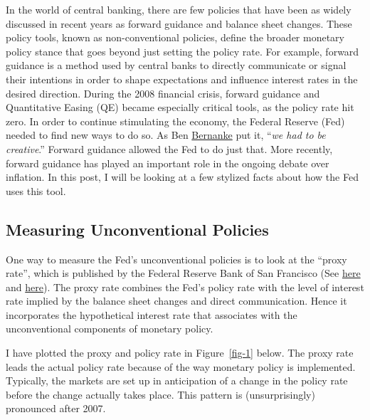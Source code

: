 \documentclass[
  letterpaper,
  DIV=11,
  numbers=noendperiod]{scrartcl}
\begin{document}
In the world of central banking, there are few policies that have been
as widely discussed in recent years as forward guidance and balance
sheet changes. These policy tools, known as non-conventional policies,
define the broader monetary policy stance that goes beyond just setting
the policy rate. For example, forward guidance is a method used by
central banks to directly communicate or signal their intentions in
order to shape expectations and influence interest rates in the desired
direction. During the 2008 financial crisis, forward guidance and
Quantitative Easing (QE) became especially critical tools, as the policy
rate hit zero. In order to continue stimulating the economy, the Federal
Reserve (Fed) needed to find new ways to do so. As Ben
\href{https://www.amazon.co.uk/21st-Century-Monetary-Policy-Inflation/dp/1324020466/ref=sr_1_1?adgrpid=1172080352962224\&hvadid=73255235197595\&hvbmt=be\&hvdev=c\&hvlocphy=4923\&hvnetw=o\&hvqmt=e\&hvtargid=kwd-73255197392577\%3Aloc-188\&hydadcr=18495_2211395\&keywords=21st+century+monetary+policy\&qid=1681764141\&sr=8-1}{Bernanke}
put it, ``\emph{we had to be creative}.'' Forward guidance allowed the
Fed to do just that. More recently, forward guidance has played an
important role in the ongoing debate over inflation. In this post, I
will be looking at a few stylized facts about how the Fed uses this
tool.

\hypertarget{measuring-unconventional-policies}{%
\subsection{Measuring Unconventional
Policies}\label{measuring-unconventional-policies}}

One way to measure the Fed's unconventional policies is to look at the
``proxy rate'', which is published by the Federal Reserve Bank of San
Francisco (See
\href{https://www.frbsf.org/economic-research/indicators-data/proxy-funds-rate/}{here}
and
\href{https://www.frbsf.org/economic-research/publications/economic-letter/2022/november/monetary-policy-stance-is-tighter-than-federal-funds-rate/}{here}).
The proxy rate combines the Fed's policy rate with the level of interest
rate implied by the balance sheet changes and direct communication.
Hence it incorporates the hypothetical interest rate that associates
with the unconventional components of monetary policy.

I have plotted the proxy and policy rate in Figure~\ref{fig-1} below.
The proxy rate leads the actual policy rate because of the way monetary
policy is implemented. Typically, the markets are set up in anticipation
of a change in the policy rate before the change actually takes place.
This pattern is (unsurprisingly) pronounced after 2007.
\end{document}
